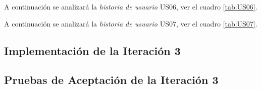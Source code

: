   A continuación se analizará la \emph{historia de usuario} US06, ver el cuadro \ref{tab:US06}.

    

    

  A continuación se analizará la \emph{historia de usuario} US07, ver el cuadro \ref{tab:US07}.

    

    



% 
%
%




  \subsection{Implementación de la Iteración 3}


      

  \subsection{Pruebas de Aceptación de la Iteración 3}

      


